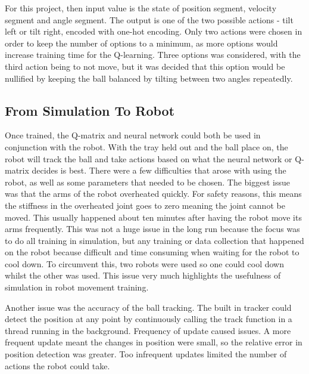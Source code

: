 \documentclass[12pt,a4paper]{article}
\begin{document}
For this project, then input value is the state of position segment, velocity segment and angle segment. The output is one of the two possible actions - tilt left or tilt right, encoded with one-hot encoding. Only two actions were chosen in order to keep the number of options to a minimum, as more options would increase training time for the Q-learning. Three options was considered, with the third action being to not move, but it was decided that this option would be nullified by keeping the ball balanced by tilting between two angles repeatedly.


\subsection{From Simulation To Robot}
Once trained, the Q-matrix and neural network could both be used in conjunction with the robot. With the tray held out and the ball place on, the robot will track the ball and take actions based on what the neural network or Q-matrix decides is best. There were a few difficulties that arose with using the robot, as well as some parameters that needed to be chosen. The biggest issue was that the arms of the robot overheated quickly. For safety reasons, this means the stiffness in the overheated joint goes to zero meaning the joint cannot be moved. This usually happened about ten minutes after having the robot move its arms frequently. This was not a huge issue in the long run because the focus was to do all training in simulation, but any training or data collection that happened on the robot because difficult and time consuming when waiting for the robot to cool down. To circumvent this, two robots were used so one could cool down whilst the other was used. This issue very much highlights the usefulness of simulation in robot movement training.

Another issue was the accuracy of the ball tracking. The built in tracker could detect the position at any point by continuously calling the track function in a thread running in the background. Frequency of update caused issues. A more frequent update meant the changes in position were small, so the relative error in position detection was greater. Too infrequent updates limited the number of actions the robot could take.
\end{document}
